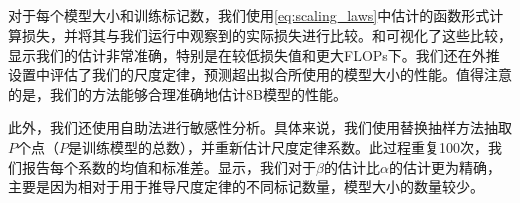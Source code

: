 \begin{figure*}[h!]
\begin{minipage}[t]{0.4\linewidth}
        \begin{minipage}[t]{\linewidth}
            \centering
            \vspace{-2.8cm}
            \setlength{\tabcolsep}{12pt}
            \renewcommand{\arraystretch}{1}
            \label{tab:scaling_laws_sensitivity_main}
        \end{minipage}
    \end{minipage}
\end{figure*}
\subsection{}
\label{sec:scaling_laws_evaluation}
对于每个模型大小和训练标记数，我们使用\cref{eq:scaling_laws}中估计的函数形式计算损失，并将其与我们运行中观察到的实际损失进行比较。和可视化了这些比较，显示我们的估计非常准确，特别是在较低损失值和更大FLOPs下。我们还在外推设置中评估了我们的尺度定律，预测超出拟合所使用的模型大小的性能。值得注意的是，我们的方法能够合理准确地估计8B模型的性能。

此外，我们还使用自助法进行敏感性分析。具体来说，我们使用替换抽样方法抽取\( P \)个点（\( P \)是训练模型的总数），并重新估计尺度定律系数。此过程重复100次，我们报告每个系数的均值和标准差。显示，我们对于\(\beta\)的估计比\(\alpha\)的估计更为精确，主要是因为相对于用于推导尺度定律的不同标记数量，模型大小的数量较少。
